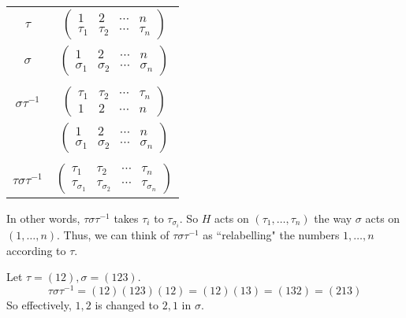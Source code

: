\begin{center}
    \begin{tabular}{cc}
        $ \tau $ & $ \begin{pmatrix}
            1 & 2 & \cdots & n \\ \tau_{1} & \tau_{2} & \cdots & \tau_{n}
        \end{pmatrix} $ \\
        $ \sigma $ & $ \begin{pmatrix}
            1 & 2 & \cdots & n \\ \sigma_{1} & \sigma_{2} & \cdots & \sigma_{n}
        \end{pmatrix} $ \\
        \relax & \relax \\
        $ \sigma\tau^{-1} $ & $ \begin{pmatrix}
            \tau_{1} & \tau_{2} & \cdots & \tau_{n} \\ 1 & 2 & \cdots & n
            \end{pmatrix} $ \\
        \relax & $ \begin{pmatrix}
            1 & 2 & \cdots & n \\ \sigma_{1} & \sigma_{2} & \cdots & \sigma_{n}
        \end{pmatrix} $ \\
        \relax & \relax \\
        $ \tau\sigma\tau^{-1} $ & $ \begin{pmatrix}
            \tau_{1} & \tau_{2} & \cdots & \tau_{n} \\
            \tau_{\sigma_{1}} & \tau_{\sigma_{2}} & \cdots & \tau_{\sigma_{n}}
        \end{pmatrix} $
    \end{tabular}
\end{center}
In other words, $ \tau\sigma\tau^{-1} $ takes $ \tau_{i} $ to $ \tau_{\sigma_{i}} $.
So $ H $ acts on $ (\tau_{1}, \dots, \tau_{n}) $ the way $ \sigma $ acts on $ (1, \dots, n) $.
Thus, we can think of $ \tau\sigma\tau^{-1} $ as ``relabelling" the numbers $ 1, \dots, n $
according to $ \tau $.

\begin{xmp}[source=Primary Source Material]
    Let $ \tau = (12), \sigma = (123) $.
    \begin{equation*}
        \tau\sigma\tau^{-1} = (12)(123)(12) = (12)(13) = (132) = (213)
    \end{equation*}
    So effectively, $ 1, 2 $ is changed to $ 2, 1 $ in $ \sigma $.
\end{xmp}

